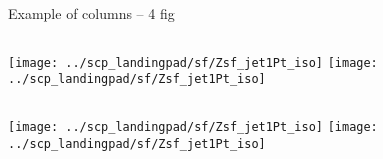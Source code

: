 \documentclass{beamer}
\begin{document}
\begin{frame}{Example of columns -- 4 fig}

	\begin{block}{}  %
		\begin{columns}[c]
			\column{0.4\paperwidth}
				\centering
				\texttt{[image: ../scp\_landingpad/sf/Zsf\_jet1Pt\_iso]}
			\column{0.4\paperwidth}
				\centering
				\texttt{[image: ../scp\_landingpad/sf/Zsf\_jet1Pt\_iso]}
		\end{columns}


	\end{block}

	\begin{block}{}  %
		\begin{columns}[c]
			\column{0.4\paperwidth}
				\centering
				\texttt{[image: ../scp\_landingpad/sf/Zsf\_jet1Pt\_iso]}
			\column{0.4\paperwidth}
				\centering
				\texttt{[image: ../scp\_landingpad/sf/Zsf\_jet1Pt\_iso]}
		\end{columns}


	\end{block}

		\end{frame}
\end{document}
